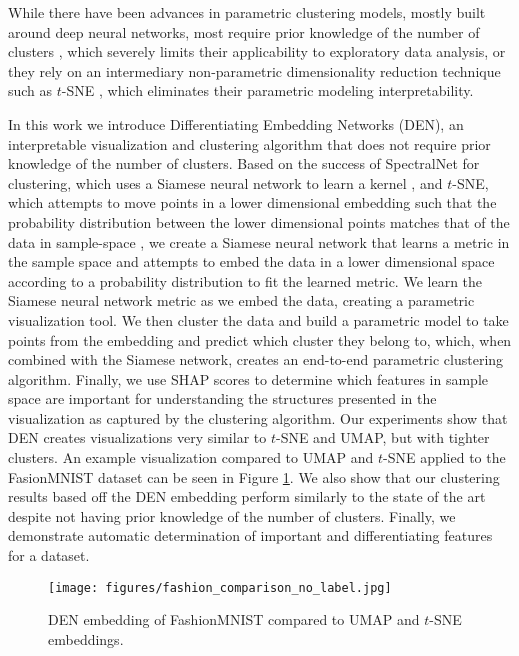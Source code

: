 \documentclass{article}
\begin{document}
While there have been advances in parametric clustering models, mostly built around deep neural networks, most require prior knowledge of the number of clusters \cite{shaham2018spectralnet, mcconville2019n2d, mrabah2019deep, yang2016joint, mukherjee2019clustergan}, which severely limits their applicability to exploratory data analysis, or they rely on an intermediary non-parametric dimensionality reduction technique such as $t$-SNE \cite{ren2020deep}, which eliminates their parametric modeling interpretability.

In this work we introduce Differentiating Embedding Networks (DEN), an interpretable visualization and clustering algorithm that does not require prior knowledge of the number of clusters. Based on the success of SpectralNet for clustering, which uses a Siamese neural network to learn a kernel \cite{shaham2018spectralnet}, and $t$-SNE, which attempts to move points in a lower dimensional embedding such that the probability distribution between the lower dimensional points matches that of the data in sample-space \cite{maaten2008visualizing}, we create a Siamese neural network that learns a metric in the sample space and attempts to embed the data in a lower dimensional space according to a probability distribution to fit the learned metric. We learn the Siamese neural network metric as we embed the data, creating a parametric visualization tool. We then cluster the data and build a parametric model to take points from the embedding and predict which cluster they belong to, which, when combined with the Siamese network, creates an end-to-end parametric clustering algorithm. Finally, we use SHAP scores to determine which features in sample space are important \cite{NIPS2017_7062} for understanding the structures presented in the visualization as captured by the clustering algorithm. Our experiments show that DEN creates visualizations very similar to $t$-SNE and UMAP, but with tighter clusters. An example visualization compared to UMAP and $t$-SNE applied to the FasionMNIST dataset \cite{xiao2017fashion} can be seen in Figure \ref{fig:fashion_mnist_embedding}. We also show that our clustering results based off the DEN embedding perform similarly to the state of the art despite not having prior knowledge of the number of clusters. Finally, we demonstrate automatic determination of important and differentiating features for a dataset.

\begin{figure}[]
    \centering
    \texttt{[image: figures/fashion\_comparison\_no\_label.jpg]}
    \caption{DEN embedding of FashionMNIST compared to UMAP and $t$-SNE embeddings.}
    \label{fig:fashion_mnist_embedding}
\end{figure}
\end{document}
